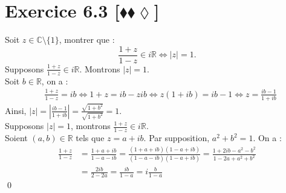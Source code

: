 \documentclass[10pt]{article}
\begin{document}

\section*{Exercice 6.3 [$\blacklozenge\blacklozenge\lozenge$]}
\begin{tcolorbox}[enhanced, width=7in, center, size=fbox, fontupper=\large, drop shadow southwest]
    Soit $z \in \mathbb{C} \setminus \{1\}$, montrer que :
    \begin{equation*}
        \frac{1+z}{1-z} \in i\mathbb{R} \iff |z| = 1.
    \end{equation*}
    Supposons $\frac{1+z}{1-z} \in i\mathbb{R}$. Montrons $|z|=1$.\\
    Soit $b\in\mathbb{R}$, on a :
    \begin{align*}
        &\frac{1+z}{1-z}=ib\iff1+z=ib-zib\iff z(1+ib)=ib-1\iff z=\frac{ib-1}{1+ib}
    \end{align*}
    Ainsi, $|z|=|\frac{ib-1}{1+ib}|=\frac{\sqrt{1+b^2}}{\sqrt{1+b^2}}=1$.\\
    Supposons $|z|=1$, montrons $\frac{1+z}{1-z} \in i\mathbb{R}$.\\
    Soient $(a,b)\in\mathbb{R}$ tels que $z=a+ib$. Par supposition, $a^2+b^2=1$. On a :
    \begin{align*}
        \frac{1+z}{1-z}&=\frac{1+a+ib}{1-a-ib}=\frac{(1+a+ib)(1-a+ib)}{(1-a-ib)(1-a+ib)}=\frac{1+2ib-a^2-b^2}{1-2a+a^2+b^2}\\
        &= \frac{2ib}{2-2a} = \frac{ib}{1-a}=i\frac{b}{1-a}
    \end{align*}
    \qed
\end{tcolorbox}

\end{document}
